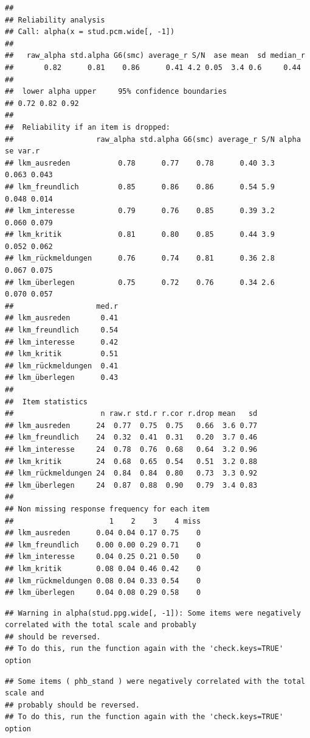 \documentclass[
  english,
  man,floatsintext]{apa6}
\begin{document}
\begin{verbatim}
## 
## Reliability analysis   
## Call: alpha(x = stud.pcm.wide[, -1])
## 
##   raw_alpha std.alpha G6(smc) average_r S/N  ase mean  sd median_r
##       0.82      0.81    0.86      0.41 4.2 0.05  3.4 0.6     0.44
## 
##  lower alpha upper     95% confidence boundaries
## 0.72 0.82 0.92 
## 
##  Reliability if an item is dropped:
##                   raw_alpha std.alpha G6(smc) average_r S/N alpha se var.r
## lkm_ausreden           0.78      0.77    0.78      0.40 3.3    0.063 0.043
## lkm_freundlich         0.85      0.86    0.86      0.54 5.9    0.048 0.014
## lkm_interesse          0.79      0.76    0.85      0.39 3.2    0.060 0.079
## lkm_kritik             0.81      0.80    0.85      0.44 3.9    0.052 0.062
## lkm_rückmeldungen      0.76      0.74    0.81      0.36 2.8    0.067 0.075
## lkm_überlegen          0.75      0.72    0.76      0.34 2.6    0.070 0.057
##                   med.r
## lkm_ausreden       0.41
## lkm_freundlich     0.54
## lkm_interesse      0.42
## lkm_kritik         0.51
## lkm_rückmeldungen  0.41
## lkm_überlegen      0.43
## 
##  Item statistics 
##                    n raw.r std.r r.cor r.drop mean   sd
## lkm_ausreden      24  0.77  0.75  0.75   0.66  3.6 0.77
## lkm_freundlich    24  0.32  0.41  0.31   0.20  3.7 0.46
## lkm_interesse     24  0.78  0.76  0.68   0.64  3.2 0.96
## lkm_kritik        24  0.68  0.65  0.54   0.51  3.2 0.88
## lkm_rückmeldungen 24  0.84  0.84  0.80   0.73  3.3 0.92
## lkm_überlegen     24  0.87  0.88  0.90   0.79  3.4 0.83
## 
## Non missing response frequency for each item
##                      1    2    3    4 miss
## lkm_ausreden      0.04 0.04 0.17 0.75    0
## lkm_freundlich    0.00 0.00 0.29 0.71    0
## lkm_interesse     0.04 0.25 0.21 0.50    0
## lkm_kritik        0.08 0.04 0.46 0.42    0
## lkm_rückmeldungen 0.08 0.04 0.33 0.54    0
## lkm_überlegen     0.04 0.08 0.29 0.58    0
\end{verbatim}

\begin{verbatim}
## Warning in alpha(stud.ppg.wide[, -1]): Some items were negatively correlated with the total scale and probably 
## should be reversed.  
## To do this, run the function again with the 'check.keys=TRUE' option
\end{verbatim}

\begin{verbatim}
## Some items ( phb_stand ) were negatively correlated with the total scale and 
## probably should be reversed.  
## To do this, run the function again with the 'check.keys=TRUE' option
\end{verbatim}
\end{document}
